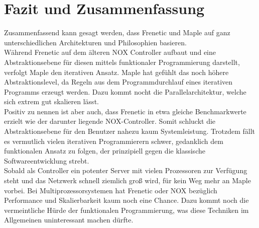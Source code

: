 \documentclass[10pt,conference]{IEEEtran}
\begin{document}
\section{Fazit und Zusammenfassung}
Zusammenfassend kann gesagt werden, dass Frenetic und Maple auf ganz unterschiedlichen Architekturen und Philosophien basieren.\\
Während Frenetic auf dem älteren NOX Controller aufbaut und eine Abstraktionsebene für diesen mittels funktionaler Programmierung darstellt, verfolgt Maple den iterativen Ansatz. Maple hat gefühlt das noch höhere Abstraktionslevel, da Regeln aus dem Programmdurchlauf eines iterativen Programms erzeugt werden. Dazu kommt nocht die Parallelarchitektur, welche sich extrem gut skalieren lässt.\\
Positiv zu nennen ist aber auch, dass Frenetic in etwa gleiche Benchmarkwerte erzielt wie der darunter liegende NOX-Controller. Somit schluckt die Abstraktionsebene für den Benutzer nahezu kaum Systemleistung. Trotzdem fällt es vermutlich vielen iterativen Programmierern schwer, gedanklich dem funktionalen Ansatz zu folgen, der prinzipiell gegen die klassische Softwareentwicklung strebt.\\
Sobald als Controller ein potenter Server mit vielen Prozessoren zur Verfügung steht und das Netzwerk schnell ziemlich groß wird, für kein Weg mehr an Maple vorbei. Bei Multiprozessorsystemen hat Frenetic oder NOX bezüglich Performance und Skalierbarkeit kaum noch eine Chance. Dazu kommt noch die vermeintliche Hürde der funktionalen Programmierung, was diese Techniken im Allgemeinen uninteressant machen dürfte.
\listoffigures
{}

\end{document}
